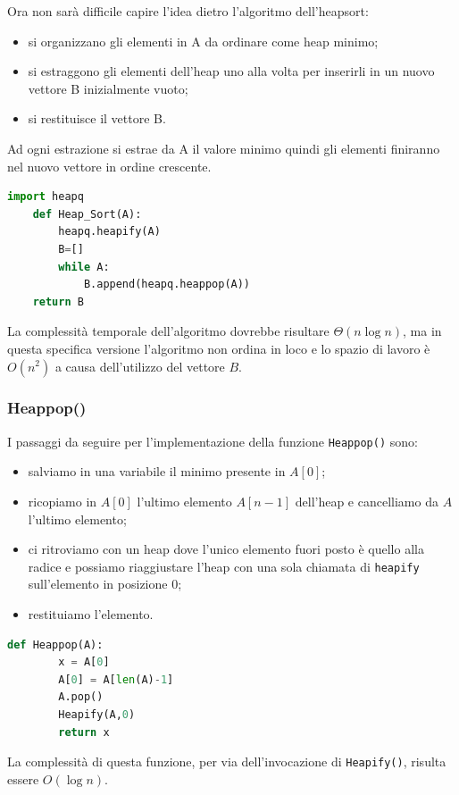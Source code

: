 Ora non sarà difficile capire l'idea dietro l’algoritmo dell’heapsort:
\begin{itemize}
    \item si organizzano gli elementi in A da ordinare come heap minimo;
    \item si estraggono gli elementi dell'heap uno alla volta per inserirli in un nuovo vettore B inizialmente vuoto;
    \item si restituisce il vettore B.
\end{itemize}

Ad ogni estrazione si estrae da A il valore minimo quindi gli elementi finiranno
nel nuovo vettore in ordine crescente.
\begin{lstlisting}[language=Python]
    import heapq
    def Heap_Sort(A):
        heapq.heapify(A)
        B=[]
        while A:
            B.append(heapq.heappop(A))
    return B
\end{lstlisting}
La complessità temporale dell'algoritmo dovrebbe risultare $\Theta(n\log n)$, ma in questa specifica versione l’algoritmo non ordina in loco e lo spazio di lavoro è $O(n^2)$ a causa dell’utilizzo del vettore $B$.

\subsubsection{Heappop()}
I passaggi da seguire per l'implementazione della funzione \verb|Heappop()| sono:
\begin{itemize}
    \item salviamo in una variabile il minimo presente in $A[0]$; 
    \item ricopiamo in $A[0]$ l’ultimo elemento $A[n-1]$ dell’heap e cancelliamo da $A$ l’ultimo elemento;
    \item ci ritroviamo con un heap dove l’unico elemento fuori posto è quello alla radice e possiamo riaggiustare l’heap con una sola chiamata di \verb|heapify| sull’elemento in posizione 0;
    \item restituiamo l’elemento.
\end{itemize}

\begin{lstlisting}[language=Python]
    def Heappop(A):
        x = A[0]
        A[0] = A[len(A)-1]
        A.pop()
        Heapify(A,0)
        return x
\end{lstlisting}
La complessità di questa funzione, per via dell'invocazione di \verb|Heapify()|, risulta essere $O(\log n)$.

